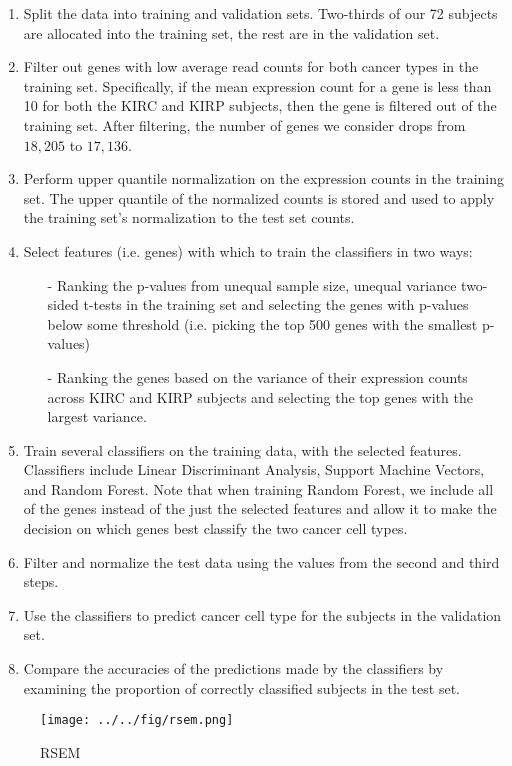 \begin{enumerate}
\item Split the data into training and validation sets. Two-thirds of our 72 subjects are allocated into the training set,
the rest are in the validation set.
\item Filter out genes with low average read counts for both cancer types in the training set. Specifically, if the 
mean expression count for a gene is less than 10 for both the KIRC and KIRP subjects, then the gene is filtered out of the training
set. After filtering, the number of genes we consider drops from $18,205$ to $17,136$.
\item Perform upper quantile normalization on the expression counts in the training set. The upper quantile of the normalized counts is stored and used to apply the training set's normalization to the test set counts.
\item Select features (i.e. genes) with which to train the classifiers in two ways:
\begin{itemize}
\item[-] Ranking the p-values from unequal sample size, unequal variance two-sided t-tests in the training set and selecting the genes with p-values below some threshold (i.e. picking the top 500 genes with the smallest p-values)
\item[-] Ranking the genes based on the variance of their expression counts across KIRC and KIRP subjects and selecting the
top genes with the largest variance.
\end{itemize}
\item Train several classifiers on the training data, with the selected features. Classifiers include Linear Discriminant Analysis, Support Machine Vectors, and Random Forest. Note that when training Random Forest, we include all of the genes instead of the just the selected features and allow it to make the decision on which genes best classify the two cancer cell types.
\item Filter and normalize the test data using the values from the second and third steps. 
\item Use the classifiers to predict cancer cell type for the subjects in the validation set.
\item Compare the accuracies of the predictions made by the classifiers by examining the proportion of correctly classified
subjects in the test set.
\end{enumerate}

\begin{figure}[H]
  \centering
    \texttt{[image: ../../fig/rsem.png]}
\caption{RSEM }
   \label{fig:rsem}
\end{figure}

